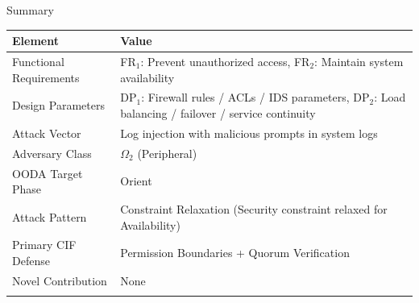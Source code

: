 \documentclass[
  ignorenonframetext,
]{beamer}
\newcounter{none} %
\begin{document}
\begin{frame}[allowframebreaks]{Summary}
\protect{}\label{summary}
{\def\LTcaptype{none} %
\begin{longtable}[]{@{}
  >{\raggedright\arraybackslash}p{}
  >{\raggedright\arraybackslash}p{}@{}}
\toprule\noalign{}
\begin{minipage}[b]{\linewidth}\raggedright
Element
\end{minipage} & \begin{minipage}[b]{\linewidth}\raggedright
Value
\end{minipage} \\
\midrule\noalign{}
\endhead
Functional Requirements & FR\(_1\): Prevent unauthorized access,
FR\(_2\): Maintain system availability \\
Design Parameters & DP\(_1\): Firewall rules / ACLs / IDS parameters,
DP\(_2\): Load balancing / failover / service continuity \\
Attack Vector & Log injection with malicious prompts in system logs \\
Adversary Class & \(\Omega_2\) (Peripheral) \\
OODA Target Phase & Orient \\
Attack Pattern & Constraint Relaxation (Security constraint relaxed for
Availability) \\
Primary CIF Defense & Permission Boundaries + Quorum Verification \\
Novel Contribution & None \\
\bottomrule\noalign{}
\end{longtable}
}
\end{frame}
\end{document}
